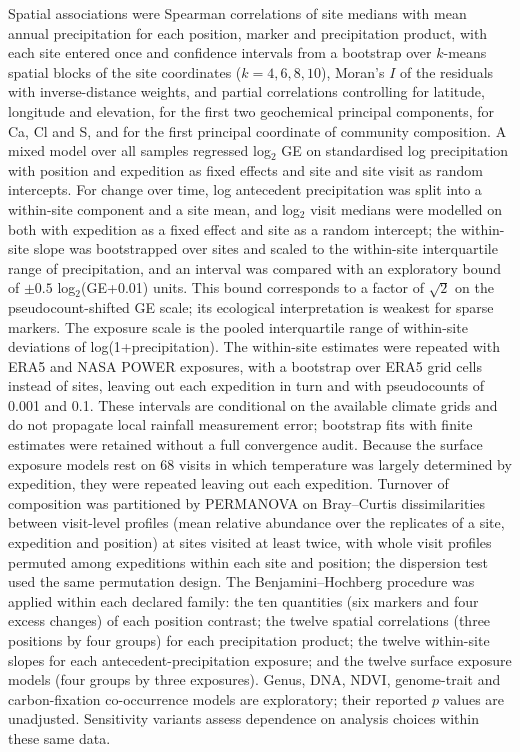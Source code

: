 \documentclass[11pt]{article}
\begin{document}
Spatial associations were Spearman correlations of site medians with mean annual precipitation for each
position, marker and precipitation product, with each site entered once and confidence intervals from a bootstrap over $k$-means spatial blocks of the site
coordinates ($k = 4, 6, 8, 10$), Moran's $I$ of the residuals with inverse-distance weights, and partial
correlations controlling for latitude, longitude and elevation, for the first two geochemical principal
components, for Ca, Cl and S, and for the first principal coordinate of community composition. A mixed
model over all samples regressed log$_2$ GE on standardised log precipitation with position and expedition
as fixed effects and site and site visit as random intercepts. For change over time, log antecedent
precipitation was split into a within-site component and a site mean, and log$_2$ visit medians were
modelled on both with expedition as a fixed effect and site as a random intercept; the within-site slope
was bootstrapped over sites and scaled to the within-site interquartile range of precipitation, and an
interval was compared with an exploratory bound of $\pm 0.5$ log$_2$(GE+0.01) units.
This bound corresponds to a factor of $\sqrt{2}$ on the pseudocount-shifted GE scale; its ecological
interpretation is weakest for sparse markers. The exposure scale is the pooled interquartile range
of within-site deviations of log(1+precipitation). The within-site estimates were repeated with ERA5 and NASA POWER exposures, with a
bootstrap over ERA5 grid cells instead of sites, leaving out each expedition in turn and with pseudocounts
of 0.001 and 0.1. These intervals are conditional on the available climate grids and do not propagate
local rainfall measurement error; bootstrap fits with finite estimates were retained without a full
convergence audit. Because the surface exposure models rest on 68 visits in which temperature was largely
determined by expedition, they were repeated leaving out each expedition. Turnover of composition was
partitioned by PERMANOVA \citep{anderson2001permanova} on Bray--Curtis dissimilarities between visit-level
profiles (mean relative abundance over the replicates of a site, expedition and position) at sites visited
at least twice, with whole visit profiles permuted among expeditions within each site and position; the
dispersion test used the same permutation design. The Benjamini--Hochberg procedure
\citep{benjamini1995fdr} was applied within each declared family: the ten quantities (six markers and four
excess changes) of each position contrast; the twelve spatial correlations (three positions by four groups)
for each precipitation product; the twelve within-site slopes for each antecedent-precipitation exposure;
and the twelve surface exposure models (four groups by three exposures). Genus, DNA, NDVI,
genome-trait and carbon-fixation co-occurrence models are exploratory; their reported $p$ values are
unadjusted. Sensitivity variants assess dependence on analysis choices within these same data.
\end{document}
